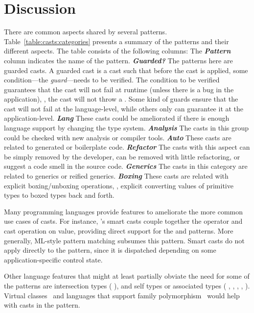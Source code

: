 \section{Discussion}\label{sec:casts:discussion}



\newcommand{\gh}[1]{\emph{\textbf{#1}}}

There are common aspects shared by several patterns.
Table~\ref{table:casts:categories} presents a summary of the patterns and their different aspects.
The table consists of the following columns:
The \gh{Pattern} column indicates the name of the pattern.
\gh{Guarded?} The patterns here are guarded casts.
A guarded cast is a cast such that before the cast is applied,
some condition---the \emph{guard}---needs to be verified.
The condition to be verified guarantees that the cast will not fail at runtime (unless there is a bug in the application), \ie,
the cast will not throw a .
Some kind of guards ensure that the cast will not fail at the language-level,
while others only can guarantee it at the application-level.
\gh{Lang} These casts could be ameliorated if there is enough language support by changing the type system.
\gh{Analysis} The casts in this group could be checked with new analysis or compiler tools.
\gh{Auto} These casts are related to generated or boilerplate code.
\gh{Refactor} The casts with this aspect can be simply removed by the developer,
can be removed with little refactoring,
or suggest a code smell in the source code.
\gh{Generics} The casts in this category are related to generics or reified generics.
\gh{Boxing} These casts are related with explicit boxing/unboxing operations, \ie{},
explicit converting values of primitive types to boxed types back and forth.

Many programming languages provide features to ameliorate the more common use cases of casts.
For instance,
\kotlin{}'s smart casts couple together the  operator and cast operation on value, 
providing direct support for the  and  patterns.
More generally, ML-style pattern matching subsumes this pattern.
Smart casts do not apply directly to the  pattern,
since it is dispatched depending on some application-specific control state.

Other language features that might at least partially obviate the need for some of the patterns are
intersection types (\cf{} ),
and self types or associated types (\cf{} 
,
,
,
,
).
Virtual classes~\citep{gbeta, scalaIndependentlyExtensible} and languages that support family polymorphism~\citep{ernstFamilyPolymorphism2001}
would help with casts in the  pattern.

